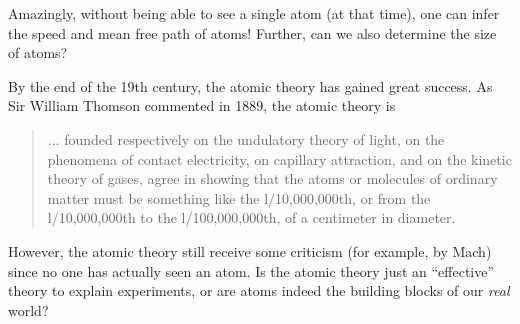 Amazingly, without being able to see a single atom (at that time), one can infer the speed and mean free path of atoms! Further, can we also determine the size of atoms?


By the end of the 19th century, the atomic theory has gained great success. As Sir William Thomson commented in 1889, the atomic theory is
\begin{quote}
    ... founded respectively on the undulatory theory of
    light, on the phenomena of contact electricity, on capillary
    attraction, and on the kinetic theory of gases, agree in 
    showing that the atoms or molecules of ordinary matter must be
    something like the l/10,000,000th, or from the l/10,000,000th
    to the l/100,000,000th, of a centimeter in diameter.
\end{quote}

However, the atomic theory still receive some criticism (for example, by Mach) since no one has actually seen an atom. Is the atomic theory just an ``effective'' theory to explain experiments, or are atoms indeed the building blocks of our \emph{real} world? 

